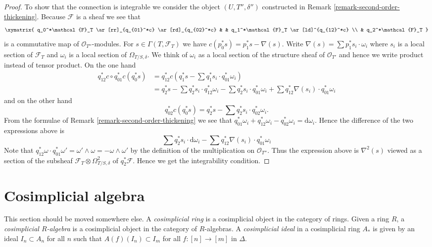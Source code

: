 \begin{proof}
\medskip\noindent
To show that the connection is integrable we consider the
object $(U, T'', \delta'')$ constructed in
Remark \ref{remark-second-order-thickening}.
Because $\mathcal{F}$ is a sheaf we see that
$$
\xymatrix{
q_0^*\mathcal{F}_T \ar[rr]_{q_{01}^*c} \ar[rd]_{q_{02}^*c} & &
q_1^*\mathcal{F}_T \ar[ld]^{q_{12}^*c} \\
& q_2^*\mathcal{F}_T
}
$$
is a commutative map of $\mathcal{O}_{T''}$-modules. For
$s \in \Gamma(T, \mathcal{F}_T)$ we have
$c(p_0^*s) = p_1^*s - \nabla(s)$. Write
$\nabla(s) = \sum p_1^*s_i \cdot \omega_i$ where $s_i$ is a local section
of $\mathcal{F}_T$ and $\omega_i$ is a local section of $\Omega_{T/S, \delta}$.
We think of $\omega_i$ as a local section of the structure
sheaf of $\mathcal{O}_{T'}$ and hence we write product instead of tensor
product. On the one hand
\begin{align*}
q_{12}^*c \circ q_{01}^*c(q_0^*s) & = 
q_{12}^*c(q_1^*s - \sum q_1^*s_i \cdot q_{01}^*\omega_i) \\
& =
q_2^*s - \sum q_2^*s_i \cdot q_{12}^*\omega_i -
\sum q_2^*s_i \cdot q_{01}^*\omega_i +
\sum q_{12}^*\nabla(s_i) \cdot q_{01}^*\omega_i
\end{align*}
and on the other hand
$$
q_{02}^*c(q_0^*s) = q_2^*s - \sum q_2^*s_i \cdot q_{02}^*\omega_i.
$$
From the formulae of Remark \ref{remark-second-order-thickening} we see
that
$q_{01}^*\omega_i + q_{12}^*\omega_i - q_{02}^*\omega_i = \text{d}\omega_i$.
Hence the difference of the two expressions above is
$$
\sum q_2^*s_i \cdot \text{d}\omega_i -
\sum q_{12}^*\nabla(s_i) \cdot q_{01}^*\omega_i
$$
Note that
$q_{12}^*\omega \cdot q_{01}^*\omega' = \omega' \wedge \omega =
- \omega \wedge \omega'$ by the definition of the multiplication on
$\mathcal{O}_{T''}$. Thus the expression above is $\nabla^2(s)$ viewed
as a section of the subsheaf $\mathcal{F}_T \otimes \Omega^2_{T/S, \delta}$ of
$q_2^*\mathcal{F}$. Hence we get the integrability condition.
\end{proof}




\section{Cosimplicial algebra}
\label{section-cosimplicial}

\noindent
This section should be moved somewhere else. A
{\it cosimplicial ring} is a cosimplicial object
in the category of rings. Given a ring $R$, a
{\it cosimplicial $R$-algebra} is a cosimplicial object in the
category of $R$-algebras. A {\it cosimplicial ideal} in a cosimplicial
ring $A_*$ is given by an ideal $I_n \subset A_n$ for all $n$ such
that $A(f)(I_n) \subset I_m$ for all $f : [n] \to [m]$ in $\Delta$.

